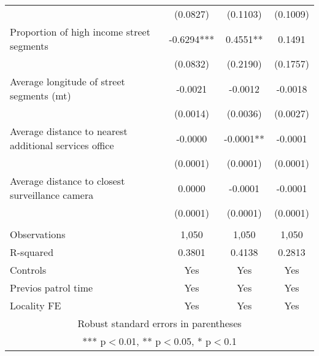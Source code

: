 \documentclass[]{article}
\begin{document}
\begin{tabular}{lccc}
 & (0.0827) & (0.1103) & (0.1009) \\
Proportion of high income street segments & -0.6294*** & 0.4551** & 0.1491 \\
 & (0.0832) & (0.2190) & (0.1757) \\
Average longitude of street segments (mt) & -0.0021 & -0.0012 & -0.0018 \\
 & (0.0014) & (0.0036) & (0.0027) \\
Average distance to nearest additional services office & -0.0000 & -0.0001** & -0.0001 \\
 & (0.0001) & (0.0001) & (0.0001) \\
Average distance to closest surveillance camera & 0.0000 & -0.0001 & -0.0001 \\
 & (0.0001) & (0.0001) & (0.0001) \\
 &  &  &  \\
Observations & 1,050 & 1,050 & 1,050 \\
R-squared & 0.3801 & 0.4138 & 0.2813 \\
Controls & Yes & Yes & Yes \\
Previos patrol time & Yes & Yes & Yes \\
 Locality FE & Yes & Yes & Yes \\ \hline
\multicolumn{4}{c}{ Robust standard errors in parentheses} \\
\multicolumn{4}{c}{ *** p$<$0.01, ** p$<$0.05, * p$<$0.1} \\
\end{tabular}
\end{document}
